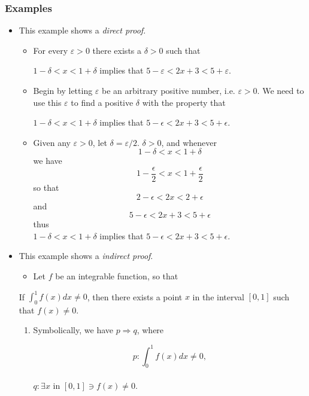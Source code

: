 \documentclass[12pt]{article}
\begin{document}
\subsubsection{Examples}
\label{sec:orgb0b3e6d}
\begin{itemize}
\item This example shows a \emph{direct proof}.
\begin{itemize}
\item For every \(\varepsilon > 0\) there exists a \(\delta > 0\) such that
\begin{center}
\(1 - \delta < x < 1 + \delta\) implies that \(5 - \varepsilon < 2x +3 < 5 + \varepsilon\).
\end{center}

\item Begin by letting \(\varepsilon\) be an arbitrary positive number, i.e. \(\varepsilon > 0\). We
need to use this \(\varepsilon\) to find a positive \(\delta\) with the property that
\begin{center}
\(1 - \delta < x < 1 + \delta\) implies that \(5 - \epsilon < 2x + 3 < 5 + \epsilon\).
\end{center}
\item Given any \(\varepsilon > 0\), let \(\delta = \varepsilon / 2\). \(\delta > 0\), and whenever
$$1-\delta<x<1+\delta$$
we have $$1-\frac{\epsilon}{2}<x<1+\frac{\epsilon}{2}$$
so that $$2-\epsilon<2x<2+\epsilon$$
and $$5-\epsilon<2x+3<5+\epsilon$$
thus \\ 
\center $1-\delta<x<1+\delta$ implies that $5-\epsilon<2x+3<5+\epsilon$.
\end{itemize}
\item This example shows a \emph{indirect proof}.
\begin{itemize}
\item Let \(f\) be an integrable function, so that
\end{itemize}
\begin{center}
If \(\int_{0}^{1}f(x)dx\neq0\), then there exists a point \(x\) in the interval \([0,1]\) such
that \(f(x)\neq0\).
\end{center}

\begin{enumerate}
\item Symbolically, we have \(p\Rightarrow{}q\), where
\begin{center}
$$p: \int_{0}^{1}f(x)dx\neq0,$$ \\
\(q: \exists{}x\) in \([0,1]\ni{}f(x)\neq0\).
\end{center}


\end{enumerate}
\end{itemize}
\end{document}
